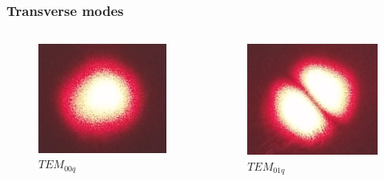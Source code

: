 \documentclass{beamer}
\begin{document}
		\begin{frame}
		\frametitle{Transverse modes}
		\begin{columns}
			\begin{column}{0.3\textwidth}
				\begin{figure}
					\centering
					\includegraphics[width=1\linewidth]{res/tem00.png}
					\vspace{-10pt}
					\caption{\footnotesize  $TEM_{00q}$}
				\end{figure}
			\end{column}
			\begin{column}{0.3\textwidth}
				\begin{figure}
					\centering
					\includegraphics[width=1\linewidth]{res/tem01.png}
					\vspace{-10pt}
					\caption{\footnotesize  $TEM_{01q}$}
				\end{figure}
			\end{column}
		\end{columns}	
		

\end{frame}
\end{document}
